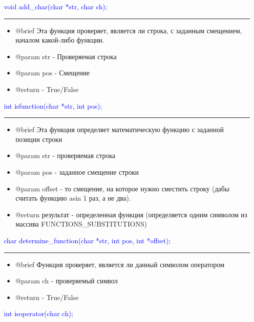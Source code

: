\documentclass{article}
\begin{document}
\textcolor{blue}{void add\_char(char *str, char ch);}


{\color{red} \rule{\linewidth}{0.5mm}}

\begin{itemize}
\item @brief Эта функция проверяет, является ли строка, с заданным смещением, началом какой-либо функции.

\item @param str - Проверяемая строка

\item @param pos - Смещение

\item @return - True/False
\end{itemize}

\textcolor{blue}{int isfunction(char *str, int pos);}


{\color{red} \rule{\linewidth}{0.5mm}}

\begin{itemize}
\item @brief Эта функция определяет математическую функцию с заданной позиции строки

\item @param str - проверяемая строка

\item @param pos - заданное смещение строки

\item @param offset - то смещение, на которое нужно сместить строку (дабы считать функцию asin 1 раз, а не два).

\item @return результат - определенная функция (определяется одним символом из массива FUNCTIONS\_SUBSTITUTIONS)
\end{itemize}

\textcolor{blue}{char determine\_function(char *str, int pos, int *offset);}


{\color{red} \rule{\linewidth}{0.5mm}}

\begin{itemize}
\item @brief Функция проверяет, является ли данный символом оператором

\item @param ch - проверяемый символ

\item @return - True/False
\end{itemize}

\textcolor{blue}{int isoperator(char ch);}
\end{document}
